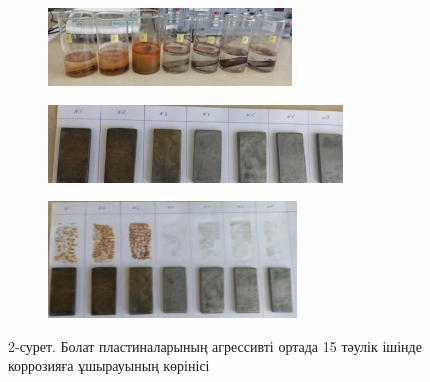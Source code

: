 \begin{figure}[H]
    \centering
    \begin{subfigure}{0.6\textwidth}
        \centering
        \includegraphics[width=\textwidth]{media/gor/image24}
        
    \end{subfigure}
    \begin{subfigure}{0.6\textwidth}
        \centering
        \includegraphics[width=\textwidth]{media/gor/image25}
        
    \end{subfigure}
    \begin{subfigure}{0.6\textwidth}
        \centering
        \includegraphics[width=\textwidth]{media/gor/image26}
       
    \end{subfigure}
    \caption*{2-сурет. Болат пластиналарының агрессивті ортада 15 тәулік ішінде коррозияға ұшырауының көрінісі}
\end{figure}

